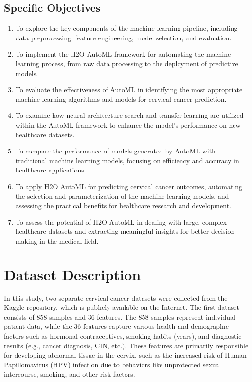 \documentclass{llncs}
\begin{document}
\subsection{Specific Objectives}
\begin{enumerate}
	\item To explore the key components of the machine learning pipeline, including data preprocessing, feature engineering, model selection, and evaluation.
	\item To implement the H2O AutoML framework for automating the machine learning process, from raw data processing to the deployment of predictive models.
	\item To evaluate the effectiveness of AutoML in identifying the most appropriate machine learning algorithms and models for cervical cancer prediction.
	\item To examine how neural architecture search and transfer learning are utilized within the AutoML framework to enhance the model's performance on new healthcare datasets.
	\item To compare the performance of models generated by AutoML with traditional machine learning models, focusing on efficiency and accuracy in healthcare applications.
	\item To apply H2O AutoML for predicting cervical cancer outcomes, automating the selection and parameterization of the machine learning models, and assessing the practical benefits for healthcare research and development.
	\item To assess the potential of H2O AutoML in dealing with large, complex healthcare datasets and extracting meaningful insights for better decision-making in the medical field.
\end{enumerate}



\section{Dataset Description}


In this study, two separate cervical cancer datasets were collected from the Kaggle repository, which is publicly available on the Internet. The first dataset consists of 858 samples and 36 features. The 858 samples represent individual patient data, while the 36 features capture various health and demographic factors such as hormonal contraceptives, smoking habits (years), and diagnostic results (e.g., cancer diagnosis, CIN, etc.). These features are primarily responsible for developing abnormal tissue in the cervix, such as the increased risk of Human Papillomavirus (HPV) infection due to behaviors like unprotected sexual intercourse, smoking, and other risk factors. 
\end{document}
